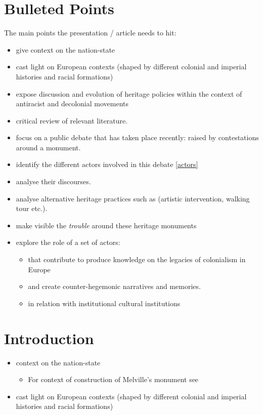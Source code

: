 \section{Bulleted Points}

The main points the presentation / article needs to hit:

\begin{itemize}    
    \item give context on the nation-state     
    \item cast light on European contexts (shaped by different colonial and imperial histories and racial formations)
    \item expose discussion and evolution of heritage policies within the context of antiracist and decolonial movements
    \item critical review of relevant literature.
    \item focus on a public debate that has taken place recently: raised by contestations around a monument. 
    \item identify the different actors involved in this debate \ref{actors}
    \item analyse their discourses. 
    \item analyse alternative heritage practices such as (artistic intervention, walking tour etc.).
    \item make visible the \textit{trouble} around these heritage monuments
    \item explore the role of a set of actors:
    \begin{itemize}
        \item that contribute to produce knowledge on the legacies of colonialism in Europe
        \item  and create counter-hegemonic narratives and memories.
        \item in relation with institutional cultural institutions        
    \end{itemize}
\end{itemize}

\section{Introduction}

\begin{itemize}
    \item context on the nation-state 
    \begin{itemize}
        \item For context of construction of Melville's monument see \cite{godard_2018}
    \end{itemize}
    \item cast light on European contexts (shaped by different colonial and imperial histories and racial formations)
\end{itemize}

